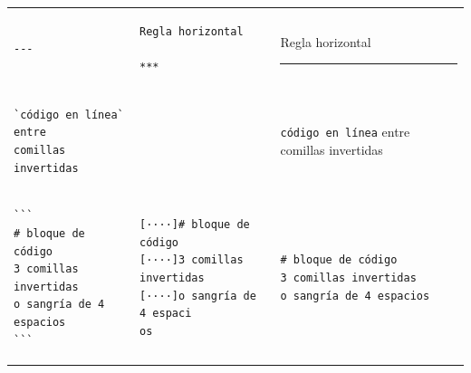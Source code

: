 \documentclass[]{book}
\theoremstyle{definition}
\theoremstyle{definition}
\theoremstyle{definition}
\theoremstyle{remark}
\begin{document}
\begin{longtable}[]{@{}lll@{}}
\begin{minipage}[t]{0.32\columnwidth}
\begin{verbatim}
---
\end{verbatim}
\strut
\end{minipage} & \begin{minipage}[t]{0.32\columnwidth}\raggedright\strut
\begin{verbatim}
Regla horizontal

***
\end{verbatim}
\strut
\end{minipage} & \begin{minipage}[t]{0.32\columnwidth}\raggedright\strut
Regla horizontal

\begin{center}\rule{0.5\linewidth}{\linethickness}\end{center}\strut
\end{minipage}\tabularnewline
\begin{minipage}[t]{0.32\columnwidth}\raggedright\strut
\begin{verbatim}
`código en línea` entre
comillas invertidas
\end{verbatim}
\strut
\end{minipage} & \begin{minipage}[t]{0.32\columnwidth}\raggedright\strut
\strut
\end{minipage} & \begin{minipage}[t]{0.32\columnwidth}\raggedright\strut
\texttt{código\ en\ línea} entre comillas invertidas\strut
\end{minipage}\tabularnewline
\begin{minipage}[t]{0.32\columnwidth}\raggedright\strut
\begin{verbatim}
```
# bloque de código
3 comillas invertidas
o sangría de 4 espacios
```
\end{verbatim}
\strut
\end{minipage} & \begin{minipage}[t]{0.32\columnwidth}\raggedright\strut
\begin{verbatim}
[····]# bloque de código
[····]3 comillas invertidas
[····]o sangría de 4 espaci
os
\end{verbatim}
\strut
\end{minipage} & \begin{minipage}[t]{0.32\columnwidth}\raggedright\strut
\begin{verbatim}
# bloque de código
3 comillas invertidas
o sangría de 4 espacios
\end{verbatim}
\strut
\end{minipage}\tabularnewline
\bottomrule
\end{longtable}
\end{document}
